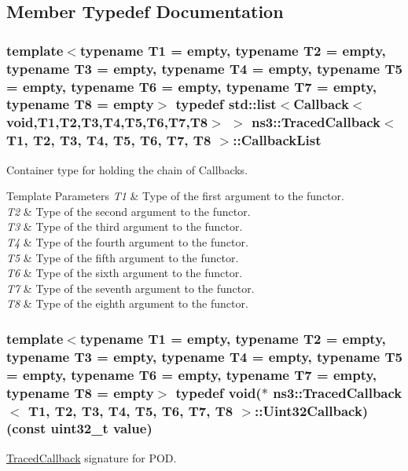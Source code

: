 \subsection{Member Typedef Documentation}
\subsubsection[{\texorpdfstring{Callback\+List}{CallbackList}}]{\setlength{\rightskip}{0pt plus 5cm}template$<$typename T1 = empty, typename T2 = empty, typename T3 = empty, typename T4 = empty, typename T5 = empty, typename T6 = empty, typename T7 = empty, typename T8 = empty$>$ typedef {\bf std\+::list}$<${\bf Callback}$<$void,T1,T2,T3,T4,T5,T6,T7,T8$>$ $>$ {\bf ns3\+::\+Traced\+Callback}$<$ T1, T2, T3, T4, T5, T6, T7, T8 $>$\+::{\bf Callback\+List}\hspace{0.3cm}{\ttfamily [private]}}\hypertarget{classns3_1_1TracedCallback_a0c8f608ad1d2f8a59df1c7cbfedcc847}{}\label{classns3_1_1TracedCallback_a0c8f608ad1d2f8a59df1c7cbfedcc847}
Container type for holding the chain of Callbacks.


\begin{DoxyTemplParams}{Template Parameters}
{\em T1} & Type of the first argument to the functor. \\
\hline
{\em T2} & Type of the second argument to the functor. \\
\hline
{\em T3} & Type of the third argument to the functor. \\
\hline
{\em T4} & Type of the fourth argument to the functor. \\
\hline
{\em T5} & Type of the fifth argument to the functor. \\
\hline
{\em T6} & Type of the sixth argument to the functor. \\
\hline
{\em T7} & Type of the seventh argument to the functor. \\
\hline
{\em T8} & Type of the eighth argument to the functor. \\
\hline
\end{DoxyTemplParams}
\subsubsection[{\texorpdfstring{Uint32\+Callback}{Uint32Callback}}]{\setlength{\rightskip}{0pt plus 5cm}template$<$typename T1 = empty, typename T2 = empty, typename T3 = empty, typename T4 = empty, typename T5 = empty, typename T6 = empty, typename T7 = empty, typename T8 = empty$>$ typedef void($\ast$  {\bf ns3\+::\+Traced\+Callback}$<$ T1, T2, T3, T4, T5, T6, T7, T8 $>$\+::Uint32\+Callback) (const uint32\+\_\+t value)}\hypertarget{classns3_1_1TracedCallback_add27924a9e14edd74e6315cabb657eb7}{}\label{classns3_1_1TracedCallback_add27924a9e14edd74e6315cabb657eb7}
\hyperlink{classns3_1_1TracedCallback}{Traced\+Callback} signature for P\+OD.


